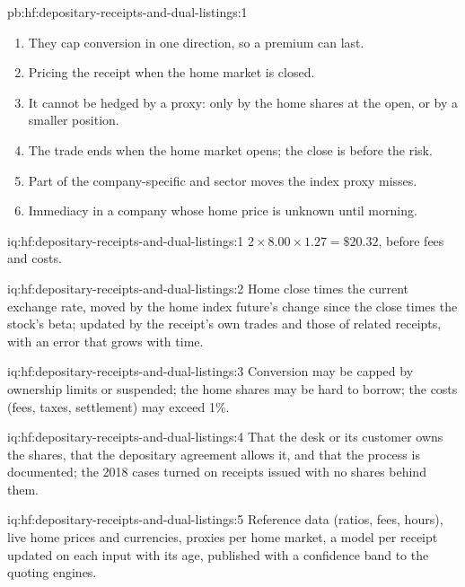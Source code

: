 \begin{solution}{pb:hf:depositary-receipts-and-dual-listings:1}
\begin{enumerate}
\item They cap conversion in one direction, so a premium can last.
\item Pricing the receipt when the home market is closed.
\item It cannot be hedged by a proxy: only by the home shares at the open, or by a smaller position.
\item The trade ends when the home market opens; the close is before the risk.
\item Part of the company-specific and sector moves the index proxy misses.
\item Immediacy in a company whose home price is unknown until morning.
\end{enumerate}
\end{solution}

\begin{solution}{iq:hf:depositary-receipts-and-dual-listings:1}
$2\times8.00\times1.27=\$20.32$, before fees and costs.
\end{solution}

\begin{solution}{iq:hf:depositary-receipts-and-dual-listings:2}
Home close times the current exchange rate, moved by the home index future's change since the close times the stock's beta; updated by the
receipt's own trades and those of related receipts, with an error that grows with time.
\end{solution}

\begin{solution}{iq:hf:depositary-receipts-and-dual-listings:3}
Conversion may be capped by ownership limits or suspended; the home shares may be hard to borrow; the costs (fees, taxes, settlement) may exceed 1\%.
\end{solution}

\begin{solution}{iq:hf:depositary-receipts-and-dual-listings:4}
That the desk or its customer owns the shares, that the depositary agreement allows it, and that the process is documented; the 2018 cases turned on
receipts issued with no shares behind them.
\end{solution}

\begin{solution}{iq:hf:depositary-receipts-and-dual-listings:5}
Reference data (ratios, fees, hours), live home prices and currencies, proxies per home market, a model per receipt updated on each input with its
age, published with a confidence band to the quoting engines.
\end{solution}

